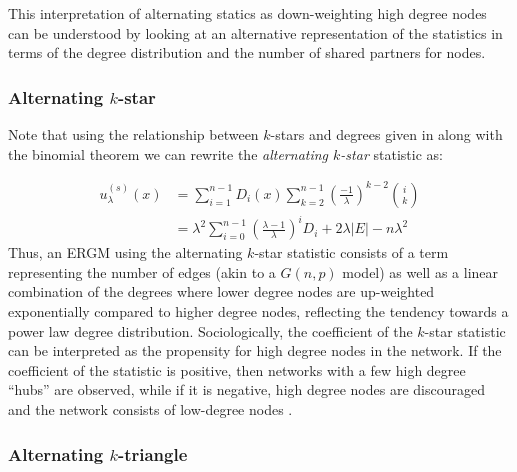  This interpretation of alternating statics as down-weighting high degree nodes can be understood by looking at an alternative representation of the statistics in terms of the degree distribution and the number of shared partners for nodes. 
 
 \subsubsection{Alternating $k$-star}
 
 Note that using the relationship between $k$-stars and degrees given in  along with the binomial theorem we can rewrite the \emph{alternating $k$-star} statistic as:
 
 \begin{align}
 \label{eq:alternative-k-star}
 u_\lambda^{(s)}(x) & = \sum_{i = 1}^{n-1} D_i(x) \sum_{k = 2}^{n-1} \left(\frac{-1}{\lambda}\right)^{k-2} \binom{i}{k}   \nonumber\\
 & =  \lambda^2 \sum_{i = 0}^{n-1} \left(\frac{\lambda - 1}{\lambda}\right)^i D_i + 2 \lambda |E| - n \lambda^2
 \end{align}
 Thus, an ERGM using the alternating $k$-star statistic consists of a term representing the number of edges (akin to a $G(n,p)$ model) as well as a linear combination of the degrees where lower degree nodes are up-weighted exponentially compared to higher degree nodes, reflecting the tendency towards a power law degree distribution. Sociologically, the coefficient of the $k$-star statistic can be interpreted as the propensity for high degree nodes in the network. If the coefficient of the statistic is positive, then networks with a few high degree ``hubs'' are observed, while if it is negative, high degree nodes are discouraged and the network consists of low-degree nodes \cite{Sni+06}.
 
\subsubsection{Alternating $k$-triangle}
 
